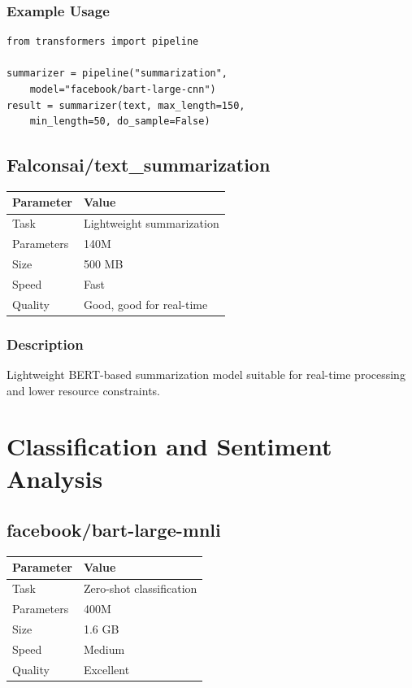 \documentclass[12pt,a4paper]{report}
\begin{document}
\subsubsection{Example Usage}

\begin{lstlisting}
from transformers import pipeline

summarizer = pipeline("summarization", 
    model="facebook/bart-large-cnn")
result = summarizer(text, max_length=150, 
    min_length=50, do_sample=False)
\end{lstlisting}

\subsection{Falconsai/text\_summarization}

\begin{tabular}{|p{3cm}|p{11cm}|}
\hline
\textbf{Parameter} & \textbf{Value} \\
\hline
Task & Lightweight summarization \\
\hline
Parameters & 140M \\
\hline
Size & 500 MB \\
\hline
Speed & Fast \\
\hline
Quality & Good, good for real-time \\
\hline
\end{tabular}

\subsubsection{Description}

Lightweight BERT-based summarization model suitable for real-time processing and lower resource constraints.

\section{Classification and Sentiment Analysis}

\subsection{facebook/bart-large-mnli}

\begin{tabular}{|p{3cm}|p{11cm}|}
\hline
\textbf{Parameter} & \textbf{Value} \\
\hline
Task & Zero-shot classification \\
\hline
Parameters & 400M \\
\hline
Size & 1.6 GB \\
\hline
Speed & Medium \\
\hline
Quality & Excellent \\
\hline
\end{tabular}
\end{document}
